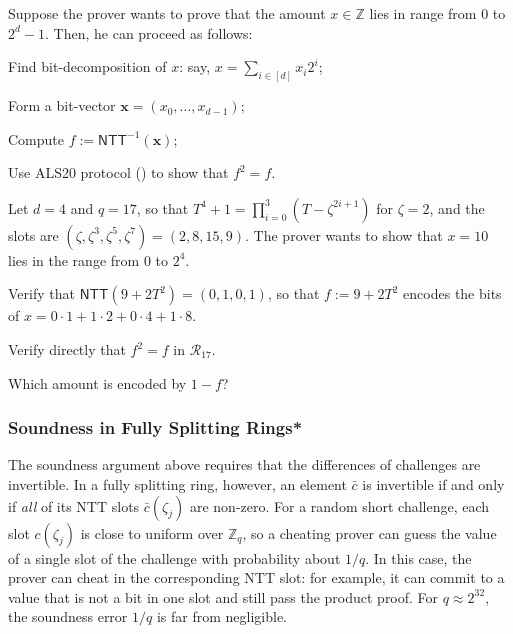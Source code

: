 \documentclass[../../book.tex]{subfiles}
\begin{document}
\begin{example}\label{example:ntt-packing}
    Suppose the prover wants to prove that the amount $x \in \mathbb{Z}$ lies in range from $0$ to $2^d-1$.
    Then, he can proceed as follows:
    \begin{algoen}
        \item Find bit-decomposition of $x$: say, $x = \sum_{i \in [d]}x_i2^i$;
        \item Form a bit-vector $\mathbf{x} = (x_0,\dots,x_{d-1})$;
        \item Compute $f := \mathsf{NTT}^{-1}(\mathbf{x})$;
        \item Use ALS20 protocol () to show that $f^2=f$.
    \end{algoen}
\end{example}

\begin{exercise}
    Let $d = 4$ and $q = 17$, so that $T^4+1 = \prod_{i=0}^{3}(T - \zeta^{2i+1})$ for $\zeta = 2$, and the slots are $(\zeta, \zeta^3, \zeta^5, \zeta^7) = (2, 8, 15, 9)$.
    The prover wants to show that $x = 10$ lies in the range from $0$ to $2^4$.
    \begin{algoen}
        \item Verify that $\mathsf{NTT}(9 + 2T^2) = (0, 1, 0, 1)$, so that $f := 9 + 2T^2$ encodes the bits of $x = 0 \cdot 1 + 1 \cdot 2 + 0 \cdot 4 + 1 \cdot 8$.
        \item Verify directly that $f^2 = f$ in $\mathcal{R}_{17}$.
        \item Which amount is encoded by $1 - f$?
    \end{algoen}

\end{exercise}

\subsubsection{Soundness in Fully Splitting Rings*}

The soundness argument above requires that the differences of challenges are invertible.
In a fully splitting ring, however, an element $\bar{c}$ is invertible if and only if \emph{all} of its NTT slots $\bar{c}(\zeta_j)$ are non-zero.
For a random short challenge, each slot $c(\zeta_j)$ is close to uniform over $\mathbb{Z}_q$, so a cheating prover can guess the value of a single slot of the challenge with probability about $1/q$.
In this case, the prover can cheat in the corresponding NTT slot: for example, it can commit to a value that is not a bit in one slot and still pass the product proof.
For $q \approx 2^{32}$, the soundness error $1/q$ is far from negligible.
\end{document}
